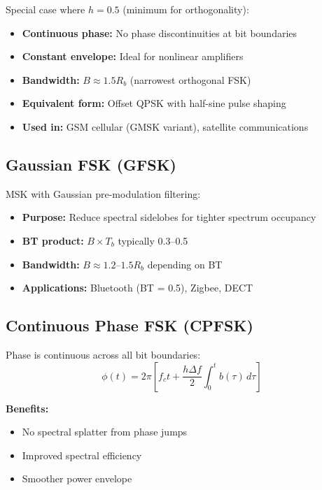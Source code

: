 Special case where $h = 0.5$ (minimum for orthogonality):

\begin{itemize}
\item \textbf{Continuous phase:} No phase discontinuities at bit boundaries
\item \textbf{Constant envelope:} Ideal for nonlinear amplifiers
\item \textbf{Bandwidth:} $B \approx 1.5 R_b$ (narrowest orthogonal FSK)
\item \textbf{Equivalent form:} Offset QPSK with half-sine pulse shaping
\item \textbf{Used in:} GSM cellular (GMSK variant), satellite communications
\end{itemize}

\subsection{Gaussian FSK (GFSK)}

MSK with Gaussian pre-modulation filtering:

\begin{itemize}
\item \textbf{Purpose:} Reduce spectral sidelobes for tighter spectrum occupancy
\item \textbf{BT product:} $B \times T_b$ typically 0.3--0.5
\item \textbf{Bandwidth:} $B \approx 1.2$--$1.5 R_b$ depending on BT
\item \textbf{Applications:} Bluetooth (BT = 0.5), Zigbee, DECT
\end{itemize}

\subsection{Continuous Phase FSK (CPFSK)}

Phase is continuous across all bit boundaries:
\begin{equation}
\phi(t) = 2\pi\left[f_c t + \frac{h\Delta f}{2}\int_0^t b(\tau)\,d\tau\right]
\end{equation}

\textbf{Benefits:}
\begin{itemize}
\item No spectral splatter from phase jumps
\item Improved spectral efficiency
\item Smoother power envelope
\end{itemize}

